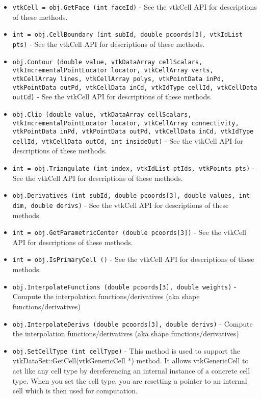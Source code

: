 \begin{itemize}
\item  \verb|vtkCell = obj.GetFace (int faceId)| -  See the vtkCell API for descriptions of these methods.

\item  \verb|int = obj.CellBoundary (int subId, double pcoords[3], vtkIdList pts)| -  See the vtkCell API for descriptions of these methods.

\item  \verb|obj.Contour (double value, vtkDataArray cellScalars, vtkIncrementalPointLocator locator, vtkCellArray verts, vtkCellArray lines, vtkCellArray polys, vtkPointData inPd, vtkPointData outPd, vtkCellData inCd, vtkIdType cellId, vtkCellData outCd)| -  See the vtkCell API for descriptions of these methods.

\item  \verb|obj.Clip (double value, vtkDataArray cellScalars, vtkIncrementalPointLocator locator, vtkCellArray connectivity, vtkPointData inPd, vtkPointData outPd, vtkCellData inCd, vtkIdType cellId, vtkCellData outCd, int insideOut)| -  See the vtkCell API for descriptions of these methods.

\item  \verb|int = obj.Triangulate (int index, vtkIdList ptIds, vtkPoints pts)| -  See the vtkCell API for descriptions of these methods.

\item  \verb|obj.Derivatives (int subId, double pcoords[3], double values, int dim, double derivs)| -  See the vtkCell API for descriptions of these methods.

\item  \verb|int = obj.GetParametricCenter (double pcoords[3])| -  See the vtkCell API for descriptions of these methods.

\item  \verb|int = obj.IsPrimaryCell ()| -  See the vtkCell API for descriptions of these methods.

\item  \verb|obj.InterpolateFunctions (double pcoords[3], double weights)| -  Compute the interpolation functions/derivatives
 (aka shape functions/derivatives)

\item  \verb|obj.InterpolateDerivs (double pcoords[3], double derivs)| -  Compute the interpolation functions/derivatives
 (aka shape functions/derivatives)

\item  \verb|obj.SetCellType (int cellType)| -  This method is used to support the vtkDataSet::GetCell(vtkGenericCell *)
 method. It allows vtkGenericCell to act like any cell type by
 dereferencing an internal instance of a concrete cell type. When
 you set the cell type, you are resetting a pointer to an internal
 cell which is then used for computation.


\end{itemize}
